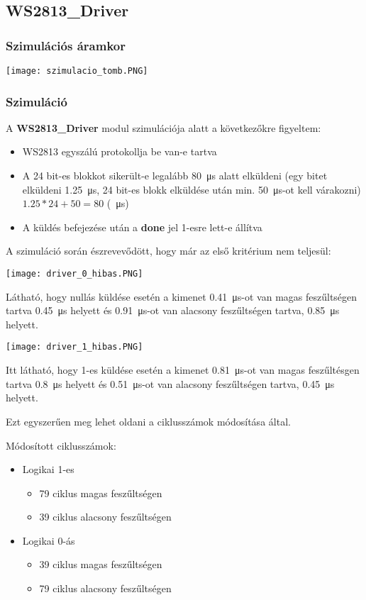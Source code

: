 \subsection{WS2813\_Driver}

\subsubsection{Szimulációs áramkor}

\texttt{[image: szimulacio\_tomb.PNG]}

\subsubsection{Szimuláció}

A \textbf{WS2813\_Driver} modul szimulációja alatt a következőkre figyeltem:
\begin{itemize}
	\item WS2813 egyszálú protokollja be van-e tartva
	\item A 24 bit-es blokkot sikerült-e legalább \SI{80}{\micro\second} alatt elküldeni (egy bitet elküldeni \SI{1.25}{\micro\second}, 24 bit-es blokk elküldése után min. \SI{50}{\micro\second}-ot kell várakozni) $1.25 * 24 + 50 = 80$ (\SI{}{\micro\second})
	\item A küldés befejezése után a \textbf{done} jel 1-esre lett-e állítva
\end{itemize}

\tab A szimuláció során észrevevődött, hogy már az első kritérium nem teljesül:

\texttt{[image: driver\_0\_hibas.PNG]}

\tab Látható, hogy nullás küldése esetén a kimenet \SI{0.41}{\micro\second}-ot van magas feszűltségen tartva \SI{0.45}{\micro\second} helyett és \SI{0.91}{\micro\second}-ot van
alacsony feszűltségen tartva, \SI{0.85}{\micro\second} helyett.

\texttt{[image: driver\_1\_hibas.PNG]}

\tab Itt látható, hogy 1-es küldése esetén a kimenet \SI{0.81}{\micro\second}-ot van magas feszűltésgen tartva \SI{0.8}{\micro\second} helyett és \SI{0.51}{\micro\second}-ot van
alacsony feszűltségen tartva, \SI{0.45}{\micro\second} helyett.

Ezt egyszerűen meg lehet oldani a ciklusszámok módosítása által.

Módosított ciklusszámok:

\begin{itemize}
\item Logikai 1-es
	\begin{itemize}
	\item 79 ciklus magas feszűltségen
	\item 39 ciklus alacsony feszűltségen
	\end{itemize}
\item Logikai 0-ás
	\begin{itemize}
	\item 39 ciklus magas feszűltségen
	\item 79 ciklus alacsony feszűltségen
	\end{itemize}
\end{itemize}

